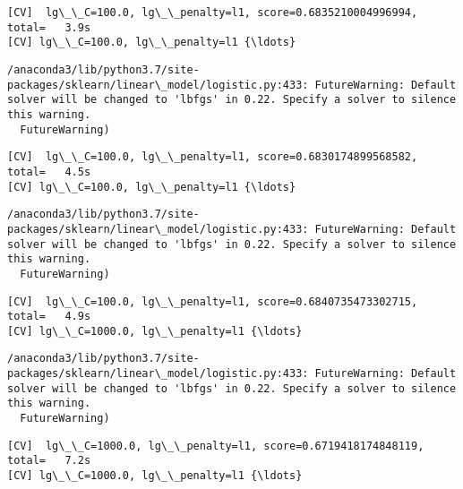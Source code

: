 \documentclass[11pt]{article}
\begin{document}
    \begin{Verbatim}[commandchars=\\\{\}]
[CV]  lg\_\_C=100.0, lg\_\_penalty=l1, score=0.6835210004996994, total=   3.9s
[CV] lg\_\_C=100.0, lg\_\_penalty=l1 {\ldots}

    \end{Verbatim}

    \begin{Verbatim}[commandchars=\\\{\}]
/anaconda3/lib/python3.7/site-packages/sklearn/linear\_model/logistic.py:433: FutureWarning: Default solver will be changed to 'lbfgs' in 0.22. Specify a solver to silence this warning.
  FutureWarning)

    \end{Verbatim}

    \begin{Verbatim}[commandchars=\\\{\}]
[CV]  lg\_\_C=100.0, lg\_\_penalty=l1, score=0.6830174899568582, total=   4.5s
[CV] lg\_\_C=100.0, lg\_\_penalty=l1 {\ldots}

    \end{Verbatim}

    \begin{Verbatim}[commandchars=\\\{\}]
/anaconda3/lib/python3.7/site-packages/sklearn/linear\_model/logistic.py:433: FutureWarning: Default solver will be changed to 'lbfgs' in 0.22. Specify a solver to silence this warning.
  FutureWarning)

    \end{Verbatim}

    \begin{Verbatim}[commandchars=\\\{\}]
[CV]  lg\_\_C=100.0, lg\_\_penalty=l1, score=0.6840735473302715, total=   4.9s
[CV] lg\_\_C=1000.0, lg\_\_penalty=l1 {\ldots}

    \end{Verbatim}

    \begin{Verbatim}[commandchars=\\\{\}]
/anaconda3/lib/python3.7/site-packages/sklearn/linear\_model/logistic.py:433: FutureWarning: Default solver will be changed to 'lbfgs' in 0.22. Specify a solver to silence this warning.
  FutureWarning)

    \end{Verbatim}

    \begin{Verbatim}[commandchars=\\\{\}]
[CV]  lg\_\_C=1000.0, lg\_\_penalty=l1, score=0.6719418174848119, total=   7.2s
[CV] lg\_\_C=1000.0, lg\_\_penalty=l1 {\ldots}

    \end{Verbatim}
\end{document}
